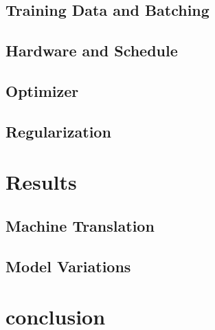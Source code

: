 \documentclass[twocolumn]{jarticle}     %
\begin{document}
\subsection{Training Data and Batching}

\subsection{Hardware and Schedule}

\subsection{Optimizer}

\subsection{Regularization}

\section{Results}

\subsection{Machine Translation}

\subsection{Model Variations}

\section{conclusion}




\end{document}
